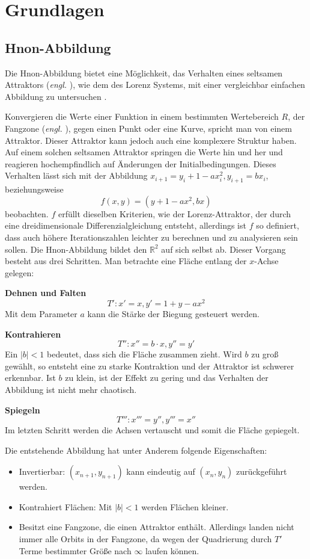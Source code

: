 
\chapter{Grundlagen}
\label{ch:Grundlagen}
\section{H\e non-Abbildung}
Die H\e non-Abbildung bietet eine Möglichkeit, das Verhalten eines seltsamen Attraktors (\textit{engl. }), wie dem des Lorenz Systems, mit einer vergleichbar einfachen Abbildung zu untersuchen \cite{henon1976}.

Konvergieren die Werte einer Funktion in einem bestimmten Wertebereich $R$, der Fangzone (\textit{engl. }), gegen einen Punkt oder eine Kurve, spricht man von einem Attraktor. Dieser Attraktor kann jedoch auch eine komplexere Struktur haben. Auf einem solchen seltsamen Attraktor springen die Werte hin und her und reagieren hochempfindlich auf Änderungen der Initialbedingungen. Dieses Verhalten lässt sich mit der Abbildung $x_{i+1}=y_i + 1- a x_i^2, y_{i+1} = bx_i$, beziehungsweise 
$$f(x,y) = (y + 1- a x^2,bx)$$
beobachten. $f$ erfüllt dieselben Kriterien, wie der Lorenz-Attraktor, der durch eine dreidimensionale Differenzialgleichung entsteht, allerdings ist $f$ so definiert, dass auch höhere Iterationszahlen leichter zu berechnen und zu analysieren sein sollen. Die H\e non-Abbildung bildet den $\mathbb{R}^2$ auf sich selbst ab. Dieser Vorgang besteht aus drei Schritten. Man betrachte eine Fläche entlang der $x$-Achse gelegen:

\textbf{Dehnen und Falten}
$$T': x'=x, y'= 1+ y - ax^2$$
Mit dem Parameter $a$ kann die Stärke der Biegung gesteuert werden.


\textbf{Kontrahieren}
$$T'': x''= b\cdot x, y''= y'$$
Ein $|b|<1$ bedeutet, dass sich die Fläche zusammen zieht. Wird $b$ zu groß gewählt, so entsteht eine zu starke Kontraktion und der Attraktor ist schwerer erkennbar. Ist $b$ zu klein, ist der Effekt zu gering und das Verhalten der Abbildung ist nicht mehr chaotisch.


\textbf{Spiegeln}
$$T''': x'''= y'', y'''= x''$$
Im letzten Schritt werden die Achsen vertauscht und somit die Fläche gepiegelt.


Die entstehende Abbildung hat unter Anderem folgende Eigenschaften:
\begin{itemize}
 \item Invertierbar: $(x_{n+1}, y_{n+1})$ kann eindeutig auf $(x_n, y_n)$ zurückgeführt werden.
 \item Kontrahiert Flächen: Mit $|b|<1$ werden Flächen kleiner.
 \item Besitzt eine Fangzone, die einen Attraktor enthält. Allerdings landen nicht immer alle Orbits in der Fangzone, da wegen der Quadrierung durch $T'$ Terme bestimmter Größe nach $\infty$ laufen können.
\end{itemize}


